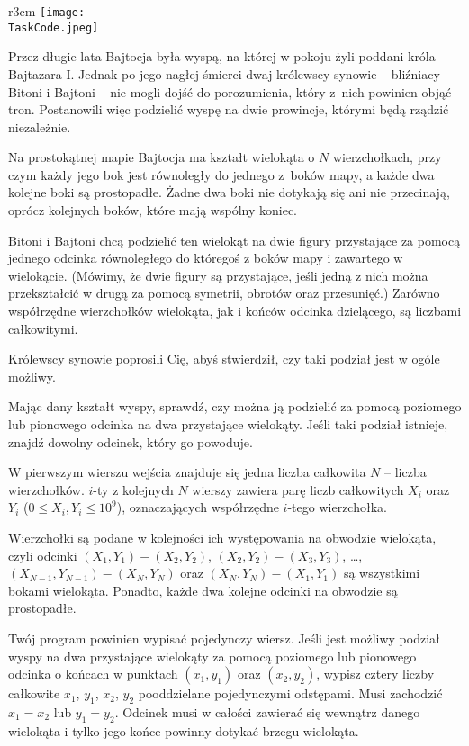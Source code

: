 \documentclass{boi2014-pl}
\renewcommand{\TaskCode}{demarcation}
\begin{document}
    \begin{wrapfigure}{r}{3cm}
        \vspace{-24pt}
		\texttt{[image: \\TaskCode.jpeg]}
	\end{wrapfigure}

    Przez długie lata Bajtocja była wyspą, na której w pokoju żyli poddani króla Bajtazara I.
  Jednak po jego nagłej śmierci dwaj królewscy synowie -- bliźniacy Bitoni i Bajtoni -- nie
  mogli dojść do porozumienia, który z~nich powinien objąć tron. Postanowili więc podzielić
  wyspę na dwie prowincje, którymi będą rządzić niezależnie.

  Na prostokątnej mapie Bajtocja ma kształt wielokąta o $N$ wierzchołkach, przy czym każdy jego bok jest równoległy
  do jednego z~boków mapy, a każde dwa kolejne boki są prostopadłe.
  Żadne dwa boki nie dotykają się ani nie przecinają, oprócz kolejnych boków, które mają wspólny koniec.
  
  Bitoni i Bajtoni chcą podzielić ten wielokąt na dwie figury przystające za pomocą
  jednego odcinka równoległego do któregoś z boków mapy i zawartego w wielokącie.
  (Mówimy, że dwie figury są przystające, jeśli jedną z nich można przekształcić w drugą za pomocą symetrii, obrotów oraz przesunięć.)
  Zarówno współrzędne wierzchołków wielokąta, jak i końców odcinka dzielącego, są liczbami całkowitymi.

  Królewscy synowie poprosili Cię, abyś stwierdził, czy taki podział jest
  w ogóle możliwy.

    \Task

    Mając dany kształt wyspy, sprawdź, czy można ją podzielić za pomocą poziomego lub pionowego
    odcinka na dwa przystające wielokąty.
    Jeśli taki podział istnieje, znajdź dowolny odcinek, który go powoduje.

    \Input
	W pierwszym wierszu wejścia znajduje się jedna liczba całkowita $N$ -- liczba wierzchołków.
        $i$-ty z kolejnych $N$ wierszy zawiera parę liczb całkowitych $X_i$ oraz $Y_i$ ($0 \le X_i, Y_i \le 10^9$), oznaczających współrzędne $i$-tego wierzchołka.

        Wierzchołki są podane w kolejności ich występowania na obwodzie wielokąta,
        czyli odcinki $(X_1,Y_1) - (X_2,Y_2)$,
    $(X_2,Y_2) - (X_3,Y_3)$, \ldots, $(X_{N-1},Y_{N-1}) - (X_N,Y_N)$ oraz
    $(X_N,Y_N) - (X_1,Y_1)$ są wszystkimi bokami wielokąta.
        Ponadto, każde dwa kolejne odcinki na obwodzie są prostopadłe.

	\Output
        Twój program powinien wypisać pojedynczy wiersz.
        Jeśli jest możliwy podział wyspy na dwa przystające wielokąty za pomocą poziomego lub pionowego odcinka o
        końcach w punktach $(x_1,y_1)$ oraz $(x_2,y_2)$, wypisz cztery liczby całkowite $x_1$, $y_1$, $x_2$, $y_2$ pooddzielane pojedynczymi odstępami.
        Musi zachodzić $x_1 = x_2$ lub $y_1 = y_2$.
        Odcinek musi w całości zawierać się wewnątrz danego wielokąta i tylko jego końce powinny dotykać brzegu wielokąta.
 
\end{document}
